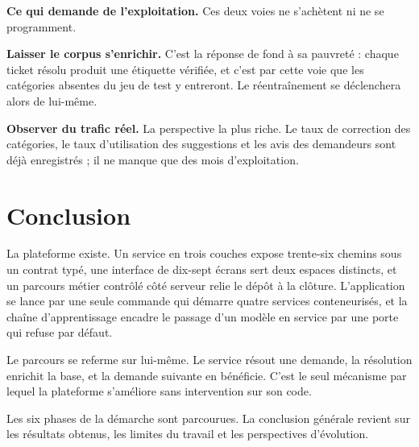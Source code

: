 \textbf{Ce qui demande de l'exploitation.} Ces deux voies ne s'achètent ni ne se programment.

\begin{puces}
\item \textbf{Laisser le corpus s'enrichir.} C'est la réponse de fond à sa pauvreté : chaque ticket
résolu produit une étiquette vérifiée, et c'est par cette voie que les catégories absentes du jeu
de test y entreront. Le réentraînement se déclenchera alors de lui-même.
\item \textbf{Observer du trafic réel.} La perspective la plus riche. Le taux de correction des
catégories, le taux d'utilisation des suggestions et les avis des demandeurs sont déjà
enregistrés ; il ne manque que des mois d'exploitation.
\end{puces}

\FloatBarrier

\section*{Conclusion}

La plateforme existe. Un service en trois couches expose trente-six chemins sous un contrat typé,
une interface de dix-sept écrans sert deux espaces distincts, et un parcours métier contrôlé côté
serveur relie le dépôt à la clôture. L'application se lance par une seule commande qui démarre
quatre services conteneurisés, et la chaîne d'apprentissage encadre le passage d'un modèle en
service par une porte qui refuse par défaut.

Le parcours se referme sur lui-même. Le service résout une demande, la résolution enrichit la base,
et la demande suivante en bénéficie. C'est le seul mécanisme par lequel la plateforme s'améliore
sans intervention sur son code.

Les six phases de la démarche sont parcourues. La conclusion générale revient sur les résultats
obtenus, les limites du travail et les perspectives d'évolution.
